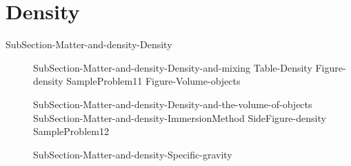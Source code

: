 \documentclass[main.tex]{subfiles}
\newcommand\chapterlabel{Ch-measurements}\setcounter{figurenewcounter}{0}\setcounter{tablenewcounter}{0}\setcounter{formulanewcounter}{0}\chapterpicture{../{\chapterlabel}/figure1}\chapterpicturelabel{PngImg}
\begin{document}
\section{Density}
{SubSection-Matter-and-density-Density}
\sloppy\begin{description}
\item[]{SubSection-Matter-and-density-Density-and-mixing}
{Table-Density} 
{Figure-density} 
{SampleProblem11}%
{Figure-Volume-objects}
\item[]{SubSection-Matter-and-density-Density-and-the-volume-of-objects}
{SubSection-Matter-and-density-ImmersionMethod}
{SideFigure-density}
{SampleProblem12}%
\item[]{SubSection-Matter-and-density-Specific-gravity}

 
\end{description}


 \checkoddpage\ifoddpage \clearpage\thispagestyle{empty}\mbox{}\clearpage \else  \fi 
\end{document}
